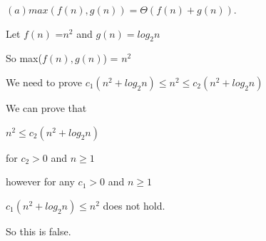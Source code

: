 \documentclass[letterpaper,portrait,12pt]{article}
\begin{document}
\begin{flushleft}
$(a) max(f (n), g(n)) = \Theta(f (n) + g(n)).$
\end{flushleft}


\begin{flushleft}
 
\end{flushleft}


\begin{flushleft}
Let $f(n)$ =$n^2$ and $g(n)=log _2n$
\end{flushleft}


\begin{flushleft}
So max($f (n), g(n)$) = $n^2$
\end{flushleft}


\begin{flushleft}
We need to prove $c_1(n^2+log_2n) \le n^2 \le c_2(n^2+log_2n)$
\end{flushleft}


\begin{flushleft}
We can prove that 
\end{flushleft}


\begin{flushleft}
$n^2 \le c_2(n^2+log_2n)$
\end{flushleft}


\begin{flushleft}
for $c_2\gt0$ and $n \ge 1$
\end{flushleft}


\begin{flushleft}
however for any $c_1 \gt 0$ and $n \ge 1$
\end{flushleft}


\begin{flushleft}
$c_1(n^2+log_2n) \le n^2$ does not hold.
\end{flushleft}


\begin{flushleft}
So this is false.
\end{flushleft}


\begin{flushleft}

\end{flushleft}


\begin{flushleft}

\end{flushleft}


\begin{flushleft}

\end{flushleft}
\end{document}

